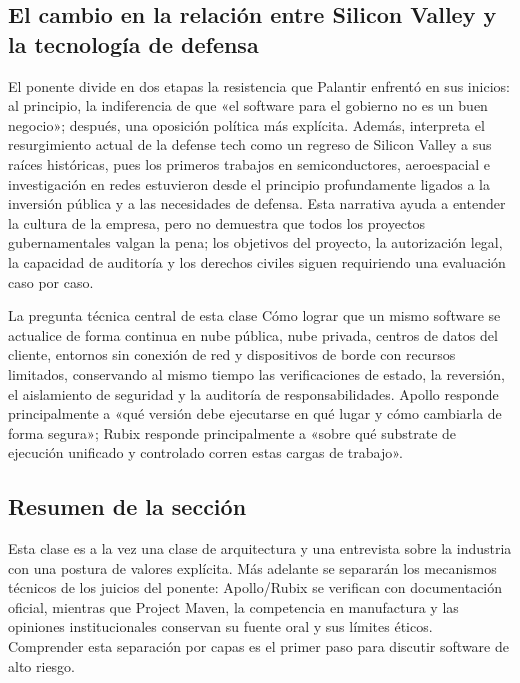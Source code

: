 \subsection{El cambio en la relación entre Silicon Valley y la tecnología de defensa}

El ponente divide en dos etapas la resistencia que Palantir enfrentó en sus inicios: al principio, la indiferencia de que «el software para el gobierno no es un buen negocio»; después, una oposición política más explícita. Además, interpreta el resurgimiento actual de la defense tech como un regreso de Silicon Valley a sus raíces históricas, pues los primeros trabajos en semiconductores, aeroespacial e investigación en redes estuvieron desde el principio profundamente ligados a la inversión pública y a las necesidades de defensa. Esta narrativa ayuda a entender la cultura de la empresa, pero no demuestra que todos los proyectos gubernamentales valgan la pena; los objetivos del proyecto, la autorización legal, la capacidad de auditoría y los derechos civiles siguen requiriendo una evaluación caso por caso.

\begin{importantbox}{La pregunta técnica central de esta clase}
Cómo lograr que un mismo software se actualice de forma continua en nube pública, nube privada, centros de datos del cliente, entornos sin conexión de red y dispositivos de borde con recursos limitados, conservando al mismo tiempo las verificaciones de estado, la reversión, el aislamiento de seguridad y la auditoría de responsabilidades. Apollo responde principalmente a «qué versión debe ejecutarse en qué lugar y cómo cambiarla de forma segura»; Rubix responde principalmente a «sobre qué substrate de ejecución unificado y controlado corren estas cargas de trabajo».
\end{importantbox}

\subsection{Resumen de la sección}

Esta clase es a la vez una clase de arquitectura y una entrevista sobre la industria con una postura de valores explícita. Más adelante se separarán los mecanismos técnicos de los juicios del ponente: Apollo/Rubix se verifican con documentación oficial, mientras que Project Maven, la competencia en manufactura y las opiniones institucionales conservan su fuente oral y sus límites éticos. Comprender esta separación por capas es el primer paso para discutir software de alto riesgo.
